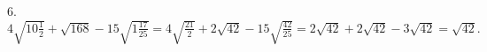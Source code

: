 6. $4\sqrt{10\frac{1}{2}}+\sqrt{168}-15\sqrt{1\frac{17}{25}}=4\sqrt{\frac{21}{2}}+2\sqrt{42}-15\sqrt{\frac{42}{25}}=
2\sqrt{42}+2\sqrt{42}-3\sqrt{42}=\sqrt{42}.$\\
